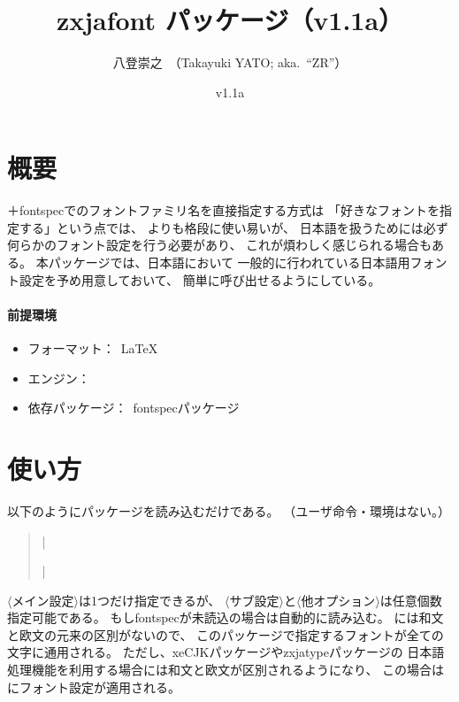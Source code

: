 \documentclass[xelatex,ja=standard,jafont=ipaex,
  a4paper]{bxjsarticle}
\newcommand{\PkgVersion}{1.1a}
\newcommand{\PkgDate}{2020/02/15}
\newcommand{\Pkg}[1]{\textsf{#1}}
\newcommand{\Meta}[1]{$\langle$\mbox{}#1\mbox{}$\rangle$}
\newcommand{\Means}{：\ }
\newcommand{\JEmph}{\textgt}
\begin{document}
\title{\Pkg{zxjafont} パッケージ（v\PkgVersion）}
\author{八登崇之\ （Takayuki YATO; aka.~``ZR''）}
\date{v\PkgVersion\quad[\PkgDate]}
\maketitle

\section{概要}

{\XeLaTeX}＋\Pkg{fontspec}でのフォントファミリ名を直接指定する方式は
「好きなフォントを指定する」という点では、
{\pLaTeX}\>よりも格段に使い易いが、
日本語を扱うためには必ず何らかのフォント設定を行う必要があり、
これが煩わしく感じられる場合もある。
本パッケージでは、日本語\>{\LaTeX}\>において
一般的に行われている日本語用フォント設定を予め用意しておいて、
簡単に呼び出せるようにしている。

\paragraph{前提環境}\mbox{}
\begin{itemize}
\item フォーマット\Means {\LaTeX}
\item エンジン\Means {\XeTeX}
\item 依存パッケージ\Means \Pkg{fontspec}パッケージ
\end{itemize}

\section{使い方}

以下のようにパッケージを読み込むだけである。
（ユーザ命令・環境はない。）
\begin{quote}\small
|\usepackage[|\Meta{メイン設定}|,|\Meta{サブ設定}|,|%
\Meta{他オプション}|]{zxjafont}|
\end{quote}

\Meta{メイン設定}は1つだけ指定できるが、
\Meta{サブ設定}と\Meta{他オプション}は任意個数指定可能である。
もし\Pkg{fontspec}が未読込の場合は自動的に読み込む。
{\XeLaTeX}\>には和文と欧文の元来の区別がないので、
このパッケージで指定するフォントが全ての文字に通用される。
ただし、\Pkg{xeCJK}パッケージや\Pkg{zxjatype}パッケージの
日本語処理機能を利用する場合には和文と欧文が区別されるようになり、
この場合は\JEmph{和文のみ}にフォント設定が適用される。
\end{document}

